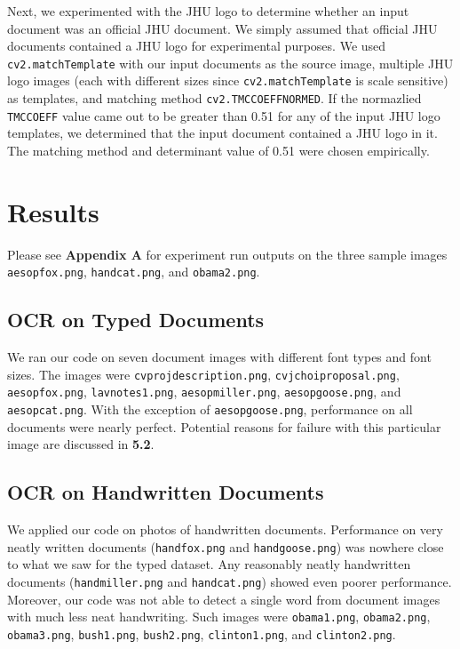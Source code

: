 \documentclass[11pt,letterpaper]{article}
\begin{document}
Next, we experimented with the JHU logo to determine whether an input document was an official JHU document. We simply assumed that official JHU documents contained a JHU logo for experimental purposes. We used {\tt cv2.matchTemplate} with our input documents as the source image, multiple JHU logo images (each with different sizes since {\tt cv2.matchTemplate} is scale sensitive) as templates, and matching method {\tt cv2.TM\textunderscore CCOEFF\textunderscore NORMED}. If the normazlied {\tt TM\textunderscore CCOEFF} value came out to be greater than 0.51 for any of the input JHU logo templates, we determined that the input document contained a JHU logo in it. The matching method and determinant value of 0.51 were chosen empirically.

\section{Results}

Please see \textbf{Appendix A} for experiment run outputs on the three sample images {\tt aesop\textunderscore fox.png}, {\tt hand\textunderscore cat.png}, and {\tt obama2.png}.

\subsection{OCR on Typed Documents}

We ran our code on seven document images with different font types and font sizes. The images were {\tt cv\textunderscore proj\textunderscore description.png}, {\tt cv\textunderscore jchoi\textunderscore proposal.png}, {\tt aesop\textunderscore fox.png}, {\tt lav\textunderscore notes1.png}, {\tt aesop\textunderscore miller.png}, {\tt aesop\textunderscore goose.png}, and {\tt aesop\textunderscore cat.png}. With the exception of {\tt aesop\textunderscore goose.png}, performance on all documents were nearly perfect. Potential reasons for failure with this particular image are discussed in \textbf{5.2}.

\subsection{OCR on Handwritten Documents}

We applied our code on photos of handwritten documents. Performance on very neatly written documents ({\tt hand\textunderscore fox.png} and {\tt hand\textunderscore goose.png}) was nowhere close to what we saw for the typed dataset. Any reasonably neatly handwritten documents ({\tt hand\textunderscore miller.png} and {\tt hand\textunderscore cat.png}) showed even poorer performance.  Moreover, our code was not able to detect a single word from document images with much less neat handwriting. Such images were {\tt obama1.png}, {\tt obama2.png}, {\tt obama3.png}, {\tt bush1.png}, {\tt bush2.png}, {\tt clinton1.png}, and {\tt clinton2.png}.
\end{document}
